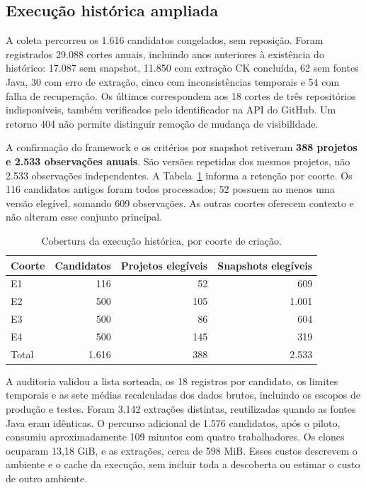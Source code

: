 \subsection{Execução histórica ampliada}
\label{subsec:ampliacao-historica}

A coleta percorreu os 1.616 candidatos congelados, sem reposição. Foram registrados 29.088 cortes anuais, incluindo anos anteriores à existência do histórico: 17.087 sem snapshot, 11.850 com extração CK concluída, 62 sem fontes Java, 30 com erro de extração, cinco com inconsistências temporais e 54 com falha de recuperação. Os últimos correspondem aos 18 cortes de três repositórios indisponíveis, também verificados pelo identificador na API do GitHub. Um retorno 404 não permite distinguir remoção de mudança de visibilidade.

A confirmação do framework e os critérios por snapshot retiveram \textbf{388 projetos e 2.533 observações anuais}. São versões repetidas dos mesmos projetos, não 2.533 observações independentes. A Tabela~\ref{tab:historico-cobertura} informa a retenção por coorte. Os 116 candidatos antigos foram todos processados; 52 possuem ao menos uma versão elegível, somando 609 observações. As outras coortes oferecem contexto e não alteram esse conjunto principal.

\begin{table}[htbp]
\centering\small
\caption{Cobertura da execução histórica, por coorte de criação.}
\label{tab:historico-cobertura}
\begin{tabular}{lrrr}
\hline
Coorte & Candidatos & Projetos elegíveis & Snapshots elegíveis \\
\hline
E1 & 116 & 52 & 609 \\
E2 & 500 & 105 & 1.001 \\
E3 & 500 & 86 & 604 \\
E4 & 500 & 145 & 319 \\
Total & 1.616 & 388 & 2.533 \\
\hline
\end{tabular}
\end{table}

A auditoria validou a lista sorteada, os 18 registros por candidato, os limites temporais e as sete médias recalculadas dos dados brutos, incluindo os escopos de produção e testes. Foram 3.142 extrações distintas, reutilizadas quando as fontes Java eram idênticas. O percurso adicional de 1.576 candidatos, após o piloto, consumiu aproximadamente 109 minutos com quatro trabalhadores. Os clones ocuparam 13,18 GiB, e as extrações, cerca de 598 MiB. Esses custos descrevem o ambiente e o cache da execução, sem incluir toda a descoberta ou estimar o custo de outro ambiente.

